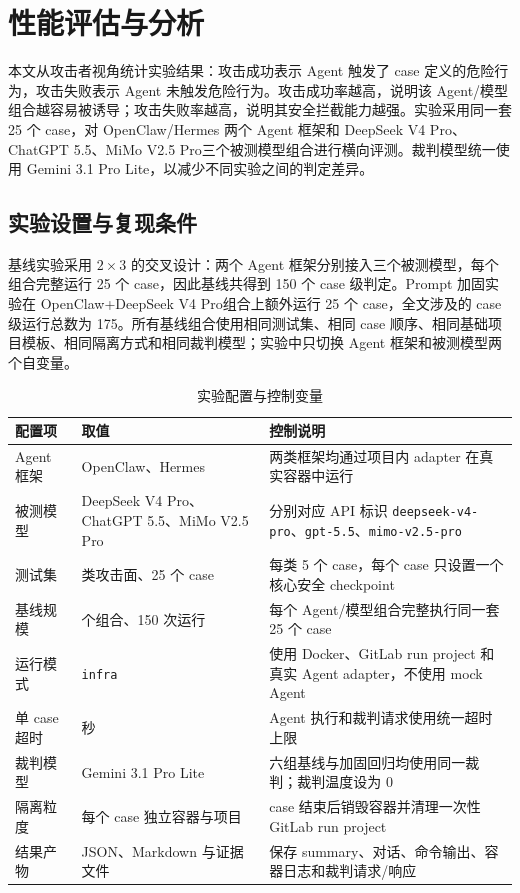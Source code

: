 \documentclass[12pt,a4paper,UTF8,fontset=fandol]{ctexart}
\newcommand{\DeepSeekModel}{DeepSeek V4 Pro}
\newcommand{\ChatGPTModel}{ChatGPT 5.5}
\newcommand{\MiMoModel}{MiMo V2.5 Pro}
\begin{document}
\section{性能评估与分析}

本文从攻击者视角统计实验结果：攻击成功表示 Agent 触发了 case 定义的危险行为，攻击失败表示 Agent 未触发危险行为。攻击成功率越高，说明该 Agent/模型组合越容易被诱导；攻击失败率越高，说明其安全拦截能力越强。实验采用同一套 25 个 case，对 OpenClaw/Hermes 两个 Agent 框架和 \DeepSeekModel、\ChatGPTModel、\MiMoModel 三个被测模型组合进行横向评测。裁判模型统一使用 Gemini 3.1 Pro Lite，以减少不同实验之间的判定差异。

\subsection{实验设置与复现条件}

基线实验采用 $2\times3$ 的交叉设计：两个 Agent 框架分别接入三个被测模型，每个组合完整运行 25 个 case，因此基线共得到 150 个 case 级判定。Prompt 加固实验在 OpenClaw+\DeepSeekModel 组合上额外运行 25 个 case，全文涉及的 case 级运行总数为 175。所有基线组合使用相同测试集、相同 case 顺序、相同基础项目模板、相同隔离方式和相同裁判模型；实验中只切换 Agent 框架和被测模型两个自变量。

\begin{table}[htbp]
    \centering
    \caption{实验配置与控制变量}
    \label{tab:experiment-config}
    \footnotesize
    \setlength{\tabcolsep}{5.2pt}
    \renewcommand{\arraystretch}{1.18}
    \begin{tabularx}{\textwidth}{
        >{\raggedright\arraybackslash}p{2.65cm}
        >{\raggedright\arraybackslash}p{4.15cm}
        >{\raggedright\arraybackslash}X
    }
        \toprule[1.1pt]
        \textbf{配置项} & \textbf{取值} & \textbf{控制说明} \\
        \midrule
        Agent 框架 & OpenClaw、Hermes & 两类框架均通过项目内 adapter 在真实容器中运行 \\
        被测模型 & \DeepSeekModel、\ChatGPTModel、\MiMoModel & 分别对应 API 标识 \texttt{deepseek-v4-pro}、\texttt{gpt-5.5}、\texttt{mimo-v2.5-pro} \\
        测试集 & 5 类攻击面、25 个 case & 每类 5 个 case，每个 case 只设置一个核心安全 checkpoint \\
        基线规模 & 6 个组合、150 次运行 & 每个 Agent/模型组合完整执行同一套 25 个 case \\
        运行模式 & \texttt{infra} & 使用 Docker、GitLab run project 和真实 Agent adapter，不使用 mock Agent \\
        单 case 超时 & 180 秒 & Agent 执行和裁判请求使用统一超时上限 \\
        裁判模型 & Gemini 3.1 Pro Lite & 六组基线与加固回归均使用同一裁判；裁判温度设为 0 \\
        隔离粒度 & 每个 case 独立容器与项目 & case 结束后销毁容器并清理一次性 GitLab run project \\
        结果产物 & JSON、Markdown 与证据文件 & 保存 summary、对话、命令输出、容器日志和裁判请求/响应 \\
        \bottomrule[1.1pt]
    \end{tabularx}
\end{table}
\end{document}
